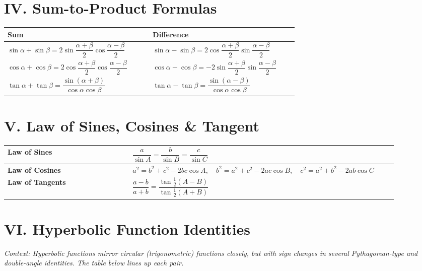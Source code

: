 \documentclass[11pt, a4paper]{article}
\begin{document}
\section*{IV. Sum-to-Product Formulas}

\begin{center}
\begin{tabular}{@{}p{0.45\linewidth} p{0.45\linewidth}@{}}
\toprule
\textbf{Sum} & \textbf{Difference} \\
\midrule
$\sin\alpha+\sin\beta = 2\sin\dfrac{\alpha+\beta}{2}\cos\dfrac{\alpha-\beta}{2}$ & $\sin\alpha-\sin\beta = 2\cos\dfrac{\alpha+\beta}{2}\sin\dfrac{\alpha-\beta}{2}$ \\[3mm]
$\cos\alpha+\cos\beta = 2\cos\dfrac{\alpha+\beta}{2}\cos\dfrac{\alpha-\beta}{2}$ & $\cos\alpha-\cos\beta = -2\sin\dfrac{\alpha+\beta}{2}\sin\dfrac{\alpha-\beta}{2}$ \\[3mm]
$\tan\alpha+\tan\beta = \dfrac{\sin(\alpha+\beta)}{\cos\alpha\cos\beta}$ & $\tan\alpha-\tan\beta = \dfrac{\sin(\alpha-\beta)}{\cos\alpha\cos\beta}$ \\
\bottomrule
\end{tabular}
\end{center}

\section*{V. Law of Sines, Cosines \& Tangent}

\begin{center}
\begin{tabular}{@{}p{0.3\linewidth} p{0.6\linewidth}@{}}
\toprule
\textbf{Law of Sines} & $\dfrac{a}{\sin A} = \dfrac{b}{\sin B} = \dfrac{c}{\sin C}$ \\
\midrule
\textbf{Law of Cosines} & $a^2 = b^2+c^2-2bc\cos A, \quad b^2 = a^2+c^2-2ac\cos B, \quad c^2 = a^2+b^2-2ab\cos C$ \\
\midrule
\textbf{Law of Tangents} & $\dfrac{a-b}{a+b} = \dfrac{\tan\frac{1}{2}(A-B)}{\tan\frac{1}{2}(A+B)}$ \\
\bottomrule
\end{tabular}
\end{center}

\section*{VI. Hyperbolic Function Identities}

\textit{Context: Hyperbolic functions mirror circular (trigonometric) functions closely, but with sign changes in several Pythagorean-type and double-angle identities. The table below lines up each pair.}
\end{document}
